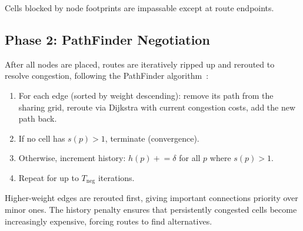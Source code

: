 \documentclass[11pt,a4paper]{article}
\begin{document}
Cells blocked by node footprints are impassable except at route endpoints.

\subsection{Phase 2: PathFinder Negotiation}

After all nodes are placed, routes are iteratively ripped up and rerouted to
resolve congestion, following the PathFinder
algorithm~\cite{mcmurchie1995}:

\begin{enumerate}
    \item For each edge (sorted by weight descending): remove its path from the
    sharing grid, reroute via Dijkstra with current congestion costs, add the
    new path back.
    \item If no cell has $s(p) > 1$, terminate (convergence).
    \item Otherwise, increment history: $h(p) \mathrel{+}= \delta$ for all $p$
    where $s(p) > 1$.
    \item Repeat for up to $T_\text{neg}$ iterations.
\end{enumerate}

Higher-weight edges are rerouted first, giving important connections priority
over minor ones. The history penalty ensures that persistently congested cells
become increasingly expensive, forcing routes to find alternatives.
\end{document}
